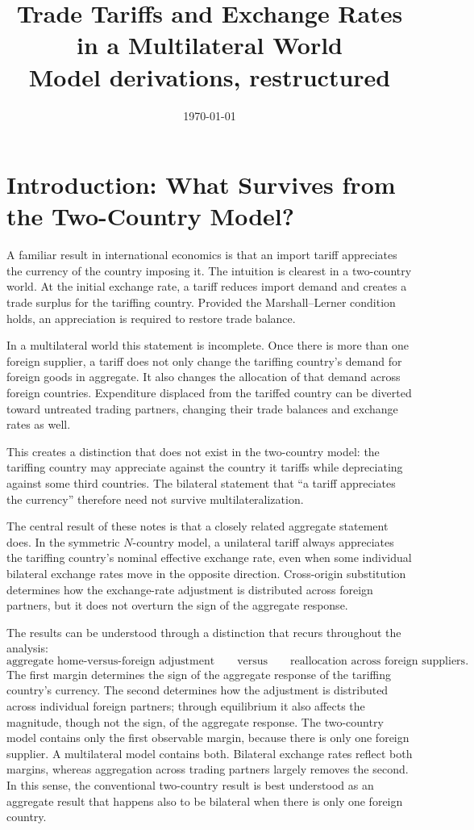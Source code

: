 \documentclass[11pt]{article}
\title{Trade Tariffs and Exchange Rates in a Multilateral World\\ \large Model derivations, restructured}
\author{}
\date{\today}
\begin{document}
\maketitle

\section{Introduction: What Survives from the Two-Country Model?}

A familiar result in international economics is that an import tariff appreciates the currency of the country imposing it. The intuition is clearest in a two-country world. At the initial exchange rate, a tariff reduces import demand and creates a trade surplus for the tariffing country. Provided the Marshall--Lerner condition holds, an appreciation is required to restore trade balance.

In a multilateral world this statement is incomplete. Once there is more than one foreign supplier, a tariff does not only change the tariffing country's demand for foreign goods in aggregate. It also changes the allocation of that demand across foreign countries. Expenditure displaced from the tariffed country can be diverted toward untreated trading partners, changing their trade balances and exchange rates as well.

This creates a distinction that does not exist in the two-country model: the tariffing country may appreciate against the country it tariffs while depreciating against some third countries. The bilateral statement that ``a tariff appreciates the currency'' therefore need not survive multilateralization.

The central result of these notes is that a closely related aggregate statement does. In the symmetric $N$-country model, a unilateral tariff always appreciates the tariffing country's nominal effective exchange rate, even when some individual bilateral exchange rates move in the opposite direction. Cross-origin substitution determines how the exchange-rate adjustment is distributed across foreign partners, but it does not overturn the sign of the aggregate response.

The results can be understood through a distinction that recurs throughout the analysis:
\[
\boxed{\text{aggregate home-versus-foreign adjustment}}
\qquad\text{versus}\qquad
\boxed{\text{reallocation across foreign suppliers}} .
\]
The first margin determines the sign of the aggregate response of the tariffing country's currency. The second determines how the adjustment is distributed across individual foreign partners; through equilibrium it also affects the magnitude, though not the sign, of the aggregate response. The two-country model contains only the first observable margin, because there is only one foreign supplier. A multilateral model contains both. Bilateral exchange rates reflect both margins, whereas aggregation across trading partners largely removes the second. In this sense, the conventional two-country result is best understood as an aggregate result that happens also to be bilateral when there is only one foreign country.
\end{document}
